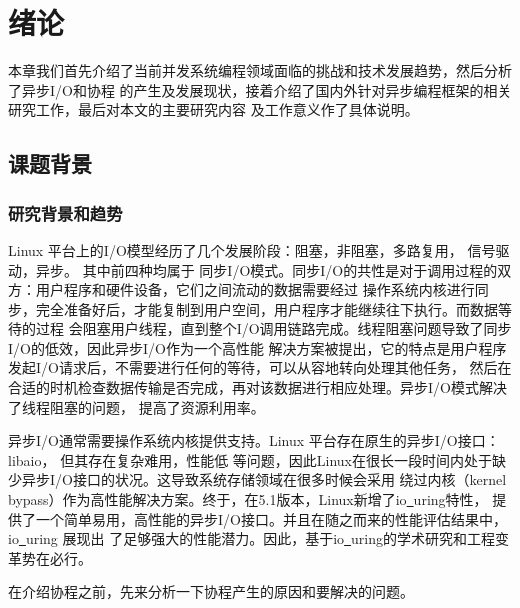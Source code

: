 \documentclass[supercite]{HustGraduPaper}
\theoremstyle{definition}
\begin{document}
\tableofcontents[level=2]
\clearpage


\section{绪论}

本章我们首先介绍了当前并发系统编程领域面临的挑战和技术发展趋势，然后分析了异步I/O和协程
的产生及发展现状，接着介绍了国内外针对异步编程框架的相关研究工作，最后对本文的主要研究内容
及工作意义作了具体说明。

\subsection{课题背景}

\subsubsection{研究背景和趋势}
Linux 平台上的I/O模型经历了几个发展阶段：阻塞，非阻塞\cite{block-io-java}，多路复用\cite{multiplex-linux}，
信号驱动\cite{signal-linux}，异步\cite{async-io-linux}。
其中前四种均属于
同步I/O模式。同步I/O的共性是对于调用过程的双方：用户程序和硬件设备，它们之间流动的数据需要经过
操作系统内核进行同步，完全准备好后，才能复制到用户空间，用户程序才能继续往下执行。而数据等待的过程
会阻塞用户线程，直到整个I/O调用链路完成。线程阻塞问题导致了同步I/O的低效，因此异步I/O作为一个高性能
解决方案被提出，它的特点是用户程序发起I/O请求后，不需要进行任何的等待，可以从容地转向处理其他任务，
然后在合适的时机检查数据传输是否完成，再对该数据进行相应处理。异步I/O模式解决了线程阻塞\cite{thread-bloking}的问题，
提高了资源利用率。\par

异步I/O通常需要操作系统内核提供支持。Linux 平台存在原生的异步I/O接口：libaio\cite{endo2020comparative}，
但其存在复杂难用，性能低
等问题，因此Linux在很长一段时间内处于缺少异步I/O接口的状况。这导致系统存储领域在很多时候会采用
绕过内核（kernel bypass\cite{chen2018survey}）作为高性能解决方案。终于，在5.1版本，Linux新增了io\underline{~}uring特性\cite{seong2020improving}，
提供了一个简单易用，高性能的异步I/O接口。并且在随之而来的性能评估结果中，io\underline{~}uring 展现出
了足够强大的性能潜力。因此，基于io\underline{~}uring的学术研究和工程变革势在必行。\par

在介绍协程之前，先来分析一下协程产生的原因和要解决的问题。\par
\end{document}
